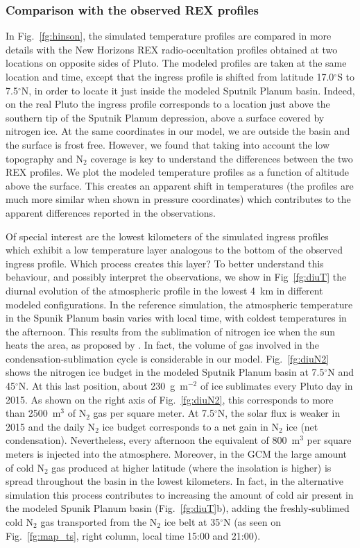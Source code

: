 \subsubsection{Comparison with the observed REX profiles}

In Fig.~\ref{fg:hinson}, the simulated temperature profiles are compared in more details with the 
New Horizons REX radio-occultation profiles
obtained at two locations on opposite sides of Pluto.  The modeled profiles are taken at the 
same location and time, except that the ingress profile is shifted
from latitude 17.0$^\circ$S to 7.5$^\circ$N, in order to locate it just inside 
the modeled Sputnik Planum basin. 
Indeed, on the real Pluto 
the ingress profile corresponds to a location just above the southern tip of
the Sputnik Planum depression, above a surface covered by nitrogen ice. At the same coordinates in
our model, we are outside the basin and the surface is frost free. However, we found that taking into
account the low topography and N$_2$ coverage is key to understand the differences between the two
REX profiles. We plot the modeled temperature profiles as a function of  
altitude above the surface. This creates an apparent shift in temperatures (the profiles are much
more similar when shown in pressure coordinates) which contributes to
the apparent differences reported in the observations. 

Of special interest are the lowest
kilometers of the simulated ingress profiles which exhibit a low temperature layer analogous to
the bottom of the observed ingress profile. Which process creates this layer?
To better understand this behaviour, and possibly interpret
the observations, we show in Fig~\ref{fg:diuT} the diurnal evolution of the atmospheric profile in
the lowest 4~km in different modeled configurations. In the reference simulation, the atmospheric
temperature in the Spunik Planum basin varies with local time, with coldest temperatures in the
afternoon.  This results from the sublimation of nitrogen ice
when the sun heats the area, as proposed by \cite{Hins:15agu}. In fact,
the volume of gas involved in the condensation-sublimation cycle is considerable in our
model. Fig.~\ref{fg:diuN2} shows the nitrogen ice budget in the modeled Sputnik Planum basin at
7.5$^\circ$N and 45$^\circ$N. At this last position, about 230~g~m$^{-2}$ of ice sublimates every
Pluto day
in 2015. As shown on the right axis of Fig.~\ref{fg:diuN2}, this corresponds to more than
2500~m$^{3}$ of N$_2$ gas per square meter. 
At 7.5$^\circ$N, the solar flux is weaker in 2015 and the daily
N$_2$ ice budget corresponds to a net gain in N$_2$ ice (net condensation). Nevertheless, every
afternoon the equivalent of 800~m$^{3}$ per square meters is injected into the atmosphere.
Moreover, in the GCM the large amount of cold N$_2$ gas produced at higher latitude (where the
insolation is higher) is spread throughout the basin in the lowest kilometers.
In fact, in the alternative simulation this process contributes 
to increasing the amount of cold air present in the modeled Spunik Planum basin
(Fig.~\ref{fg:diuT}b), 
adding the
freshly-sublimed cold N$_2$ gas
transported from the N$_2$ ice belt at 35$^\circ$N (as seen on Fig.~\ref{fg:map_ts}, right
column, local time 15:00 and 21:00). 

